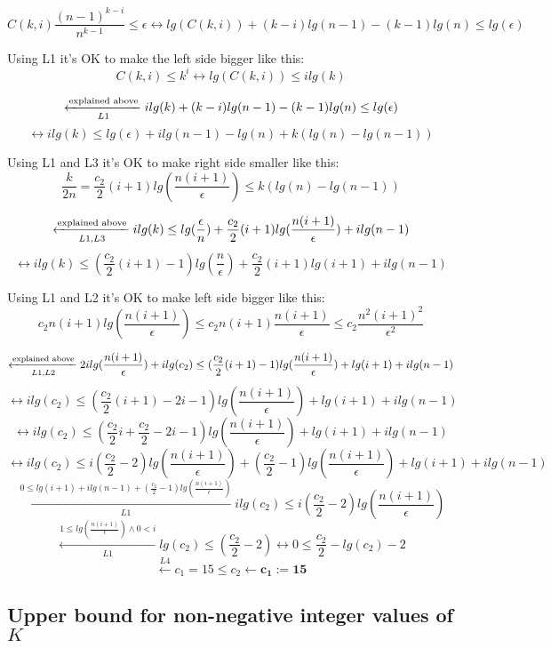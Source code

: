 \documentclass[oneside]{book}
\begin{document}
$$C(k, i) \frac{(n-1)^{k-i}}{n^{k-1}} \le \epsilon \leftrightarrow lg(C(k, i)) + (k-i) lg(n-1) - (k-1) lg(n) \le lg(\epsilon)$$
\begin{tcolorbox}
Using L1 it's OK to make the left side bigger like this:\newline 
$$C(k, i) \le k^i \leftrightarrow lg(C(k, i)) \le i lg(k)$$
\end{tcolorbox}
$$\xleftarrow[L1]{\textnormal{explained above}} ilg(k)+(k-i)lg(n-1)-(k-1)lg(n) \le lg(\epsilon)$$
$$\leftrightarrow ilg(k) \le lg(\epsilon) + i lg(n-1) - lg(n) + k(lg(n) - lg(n-1))$$
\begin{tcolorbox}
Using L1 and L3 it's OK to make right side smaller like this:\newline
$$\frac{k}{2n} = \frac{c_2}{2}(i+1)lg(\frac{n(i+1)}{\epsilon}) \le k(lg(n) - lg(n-1))$$
\end{tcolorbox}
$$\xleftarrow[L1, L3]{\textnormal{explained above}} ilg(k) \le lg(\frac{\epsilon}{n})+\frac{c_2}{2}(i+1)lg(\frac{n(i+1)}{\epsilon})+ilg(n-1)$$
$$\leftrightarrow ilg(k) \le (\frac{c_2}{2}(i+1)-1)lg(\frac{n}{\epsilon})+\frac{c_2}{2}(i+1)lg(i+1)+ilg(n-1)$$
\begin{tcolorbox}
Using L1 and L2 it's OK to make left side bigger like this:\newline 
$$c_2n(i+1)lg(\frac{n(i+1)}{\epsilon}) \le c_2n(i+1)\frac{n(i+ 1)}{\epsilon} \le c_2\frac{n^2(i+1)^2}{\epsilon^2}$$
\end{tcolorbox}
$$\xleftarrow[L1, L2]{\textnormal{explained above}} 2ilg(\frac{n(i+1)}{\epsilon})+ilg(c_2) \le (\frac{c_2}{2}(i+1)-1)lg(\frac{n(i+1)}{\epsilon})+lg(i+1)+ilg(n-1)$$
$$\leftrightarrow ilg(c_2) \le (\frac{c_2}{2}(i+1)-2i-1)lg(\frac{n(i+1)}{\epsilon})+lg(i+1)+ilg(n-1)$$
$$\leftrightarrow ilg(c_2) \le (\frac{c_2}{2}i+\frac{c_2}{2}-2i-1)lg(\frac{n(i+1)}{\epsilon}) + lg(i+1) + ilg(n-1)$$
$$\leftrightarrow ilg(c_2) \le i(\frac{c_2}{2} - 2)lg(\frac{n(i+1)}{\epsilon}) + (\frac{c_2}{2} - 1)lg(\frac{n(i+1)}{\epsilon}) + lg(i+1) + ilg(n-1)$$
$$\xleftarrow[L1]{0 \le lg(i + 1) + i lg(n - 1) + (\frac{c_2}{2} - 1)lg(\frac{n(i+1)}{\epsilon})} ilg(c_2) \le i(\frac{c_2}{2}-2)lg(\frac{n(i+1)}{\epsilon})$$
$$\xleftarrow[L1]{1 \le lg(\frac{n(i+1)}{\epsilon}) \land 0 < i} lg(c_2) \le (\frac{c_2}{2} - 2) \leftrightarrow 0 \le \frac{c_2}{2} - lg(c_2) - 2 $$
$$\xleftarrow{L4} c_1 = 15 \le c_2 \leftarrow \mathbf{c_1 := 15}$$

\subsection{Upper bound for non-negative integer values of $K$}
\end{document}

